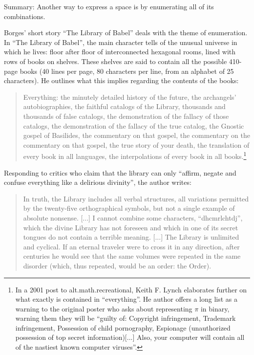 \documentclass{thesis}
\begin{document}
	Summary: Another way to express a space is by enumerating all of its combinations.

	Borges' short story ``The Library of Babel''\cite{borges_library_2000} deals with the theme of enumeration.	In ``The Library of Babel'', the main character tells of the unusual universe in which he lives: floor after floor of interconnected hexagonal rooms, lined with rows of books on shelves. These shelves are said to contain all the possible 410-page books (40 lines per page, 80 characters per line, from an alphabet of 25 characters). He outlines what this implies regarding the contents of the books:
	
	\begin{quote}
	Everything: the minutely detailed history of the future, the archangels' autobiographies, the faithful catalogs of the Library, thousands and thousands of false catalogs, the demonstration of the fallacy of those catalogs, the demonstration of the fallacy of the true catalog, the Gnostic gospel of Basilides, the commentary on that gospel, the commentary on the commentary on that gospel, the true story of your death, the translation of every book in all languages, the interpolations of every book in all books.\footnote{In a 2001 post to alt.math.recreational, Keith F. Lynch elaborates further on what exactly is contained in ``everything''.\cite{keith_f._lynch_converting_????} He author offers a long list as a warning to the original poster who asks about representing $\pi$ in binary, warning them they will be ``guilty of: Copyright infringement, Trademark infringement, Possession of child pornography, Espionage (unauthorized possession of top secret information)[...] Also, your computer will contain all of the nastiest known computer viruses''.}
	\end{quote}
	
	Responding to critics who claim that the library can only ``affirm, negate and confuse everything like a delirious divinity'', the author writes:
	
	\begin{quote}
	In truth, the Library includes all verbal structures, all variations permitted by the twenty-five orthographical symbols, but not a single example of absolute nonsense. [...] I cannot combine some characters, ``dhcmrlchtdj'', which the divine Library has not foreseen and which in one of its secret tongues do not contain a terrible meaning. [...] The Library is unlimited and cyclical. If an eternal traveler were to cross it in any direction, after centuries he would see that the same volumes were repeated in the same disorder (which, thus repeated, would be an order: the Order).
	\end{quote}
	
\end{document}
